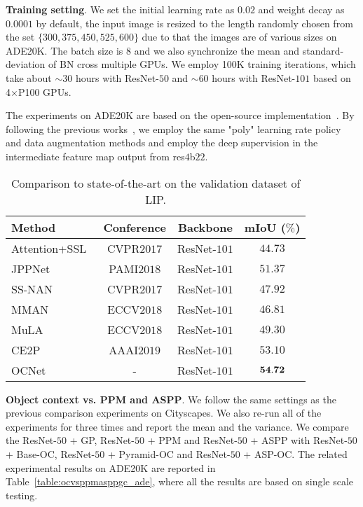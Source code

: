 \documentclass[10pt,twocolumn,letterpaper]{article}
\begin{document}
\vspace{.1cm}
\noindent\textbf{Training setting}.
We set the initial learning rate as $0.02$ and weight decay as $0.0001$ by default, the input image is resized to the length randomly chosen from the set $\{300,375,450,525,600\}$ due to that the images are of various sizes on ADE20K. The batch size is 8 and we also synchronize the mean and standard-deviation of BN cross multiple GPUs. We employ 100K training iterations, which take about $\sim30$ hours with ResNet-$50$ and $\sim60$ hours with ResNet-$101$ based on 4$\times$P100 GPUs. 

The experiments on ADE20K are based on the open-source implementation~\cite{zhou2017scene}. 
By following the previous works~\cite{zhao2017pyramid,chen2017rethinking}, we employ the same "poly" learning rate policy and data augmentation methods and employ the deep supervision in the intermediate feature map output from res$4$b$22$.

\begin{table}[htb]
\centering
\footnotesize
\caption{\small{Comparison to state-of-the-art on the validation dataset of LIP.}}
\begin{tabular}{l|c|c|c} \hline
Method & Conference & Backbone & mIoU ($\%$)  \\
\hline 
Attention+SSL~\cite{Gong_2017_CVPR} &  CVPR$2017$  & ResNet-$101$  &  $44.73$\\ 
JPPNet~\cite{liang2018look}         &  PAMI$2018$  & ResNet-$101$  &  $51.37$ \\ 
SS-NAN~\cite{zhao2017self}       &  CVPR$2017$  & ResNet-$101$  &  $47.92$ \\ 
MMAN~\cite{luo2018macro} &  ECCV$2018$   & ResNet-$101$  &  $46.81$ \\ 
MuLA~\cite{nie2018mutual} &  ECCV$2018$  & ResNet-$101$  &  $49.30$ \\ 
CE2P~\cite{liu2018devil}  &  AAAI$2019$     & ResNet-$101$  &  \underline{$53.10$} \\ 
OCNet & - &  ResNet-$101$ & $\bf{54.72}$ \\
\hline
\end{tabular}
\label{table:ocnet_sota_exp_lip}
\end{table}

\vspace{0.1cm}
\noindent\textbf{Object context vs. PPM and ASPP}.
We follow the same settings as the previous comparison experiments on Cityscapes.
We also re-run all of the experiments for three times and  report the mean and the variance. 
We compare the ResNet-$50$ + GP, ResNet-$50$ + PPM and ResNet-$50$ + ASPP with ResNet-$50$ + Base-OC, ResNet-$50$ + Pyramid-OC and ResNet-$50$ + ASP-OC. The related experimental results on ADE20K are reported in Table~\ref{table:ocvsppmasppgc_ade}, where all the results are based on single scale testing.
\end{document}
